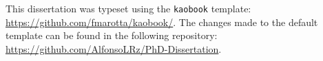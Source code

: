 \vspace*{\fill}
\normalsize 
This dissertation was typeset using the \verb|kaobook| template: \url{https://github.com/fmarotta/kaobook/}. The changes made to the default template can be found in the following repository: \url{https://github.com/AlfonsoLRz/PhD-Dissertation}.
\normalsize